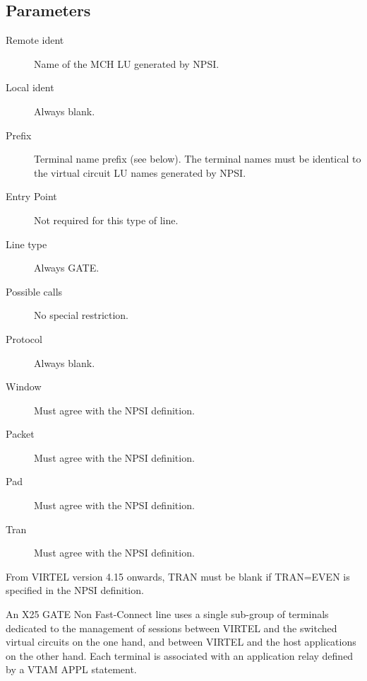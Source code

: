 \documentclass[letterpaper,10pt,english]{sphinxmanual}
\begin{document}

\ignorespaces 

\subsection{Parameters}
\label{\detokenize{connectivity_guide:index-62}}\label{\detokenize{connectivity_guide:id28}}\begin{description}
\item[{Remote ident}] \leavevmode
Name of the MCH LU generated by NPSI.

\item[{Local ident}] \leavevmode
Always blank.

\item[{Prefix}] \leavevmode
Terminal name prefix (see below). The terminal names must be
identical to the virtual circuit LU names generated by NPSI.

\item[{Entry Point}] \leavevmode
Not required for this type of line.

\item[{Line type}] \leavevmode
Always GATE.

\item[{Possible calls}] \leavevmode
No special restriction.

\item[{Protocol}] \leavevmode
Always blank.

\item[{Window}] \leavevmode
Must agree with the NPSI definition.

\item[{Packet}] \leavevmode
Must agree with the NPSI definition.

\item[{Pad}] \leavevmode
Must agree with the NPSI definition.

\item[{Tran}] \leavevmode
Must agree with the NPSI definition.

\end{description}

From VIRTEL version 4.15 onwards, TRAN must be blank if TRAN=EVEN is specified in the NPSI definition.

An X25 GATE Non Fast-Connect line uses a single sub-group of terminals dedicated to the management of sessions between VIRTEL and the switched virtual circuits on the one hand, and between VIRTEL and the host applications on the other hand. Each terminal is associated with an application relay defined by a VTAM APPL statement.
\end{document}
